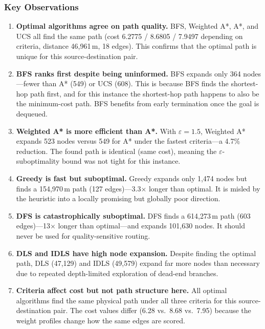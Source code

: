 ﻿\documentclass[a4paper, 12pt]{article}
\theoremstyle{remark}
\begin{document}
\subsubsection{Key Observations}

\begin{enumerate}
    \item \textbf{Optimal algorithms agree on path quality.} BFS, Weighted A*, A*, and UCS all find the same path (cost 6.2775 / 8.6805 / 7.9497 depending on criteria, distance 46,961\,m, 18 edges). This confirms that the optimal path is unique for this source-destination pair.

    \item \textbf{BFS ranks first despite being uninformed.} BFS expands only 364 nodes---fewer than A* (549) or UCS (608). This is because BFS finds the shortest-hop path first, and for this instance the shortest-hop path happens to also be the minimum-cost path. BFS benefits from early termination once the goal is dequeued.

    \item \textbf{Weighted A* is more efficient than A*.} With $\varepsilon = 1.5$, Weighted A* expands 523 nodes versus 549 for A* under the fastest criteria---a 4.7\% reduction. The found path is identical (same cost), meaning the $\varepsilon$-suboptimality bound was not tight for this instance.

    \item \textbf{Greedy is fast but suboptimal.} Greedy expands only 1,474 nodes but finds a 154,970\,m path (127 edges)---3.3$\times$ longer than optimal. It is misled by the heuristic into a locally promising but globally poor direction.

    \item \textbf{DFS is catastrophically suboptimal.} DFS finds a 614,273\,m path (603 edges)---13$\times$ longer than optimal---and expands 101,630 nodes. It should never be used for quality-sensitive routing.

    \item \textbf{DLS and IDLS have high node expansion.} Despite finding the optimal path, DLS (47,129) and IDLS (49,579) expand far more nodes than necessary due to repeated depth-limited exploration of dead-end branches.

    \item \textbf{Criteria affect cost but not path structure here.} All optimal algorithms find the same physical path under all three criteria for this source-destination pair. The cost values differ (6.28 vs.\ 8.68 vs.\ 7.95) because the weight profiles change how the same edges are scored.
\end{enumerate}
\end{document}
